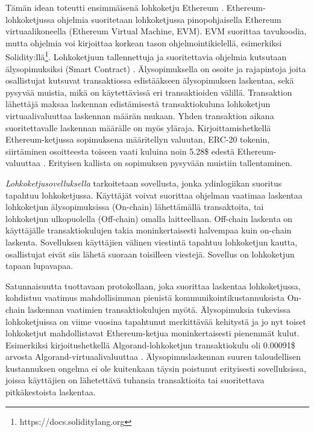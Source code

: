 Tämän idean toteutti ensimmäisenä lohkoketju Ethereum \cite{buterin_ethereum_2014}. Ethereum-lohkoketjussa ohjelmia suoritetaan lohkoketjussa pinopohjaisella Ethereum virtuaalikoneella (Ethereum Virtual Machine, EVM). EVM suorittaa tavukoodia, mutta ohjelmia voi kirjoittaa korkean tason ohjelmointikielellä, esimerkiksi Solidity:llä\footnote{https://docs.soliditylang.org}. Lohkoketjuun tallennettuja ja suoritettavia ohjelmia kutsutaan älysopimuksiksi (Smart Contract) \cite{buterin_ethereum_2014}.  Älysopimuksella on osoite ja rajapintoja joita osallistujat kutsuvat transaktiossa edistääkseen älysopimuksen laskentaa, sekä pysyvää muistia, mikä on käytettävissä eri transaktioiden välillä. Transaktion lähettäjä maksaa laskennan edistämisestä transaktiokuluna lohkoketjun virtuaalivaluuttaa laskennan määrän mukaan. Yhden transaktion aikana suoritettavalle laskennan määrälle on myös yläraja. Kirjoittamishetkellä Ethereum-ketjussa sopimuksena määritellyn valuutan, ERC-20 tokenin, siirtäminen osoitteesta toiseen vaati kuluina noin 5.28\$ edestä Ethereum-valuuttaa \cite{etherscanio_ethereum_nodate}. Erityisen kallista on sopimuksen pysyvään muistiin tallentaminen.

\textit{Lohkoketjusovelluksella} tarkoitetaan sovellusta, jonka ydinlogiikan suoritus tapahtuu lohkoketjussa. Käyttäjät voivat suorittaa ohjelman vaatimaa laskentaa lohkoketjun älysopimuksissa (On-chain) lähettämällä transaktoita, tai lohkoketjun ulkopuolella (Off-chain) omalla laitteellaan. Off-chain laskenta on käyttäjälle transaktiokulujen takia moninkertaisesti halvempaa kuin on-chain laskenta. Sovelluksen käyttäjien välinen viestintä tapahtuu lohkoketjun kautta, osallistujat eivät siis lähetä suoraan toisilleen viestejä. Sovellus on lohkoketjun tapaan lupavapaa.

Satunnaisuutta tuottavaan protokollaan, joka suorittaa laskentaa lohkoketjussa, kohdistuu vaatimus mahdollisimman pienistä kommunikointikustannuksista On-chain laskennan vaatimien transaktiokulujen myötä. Älysopimuksia tukevissa lohkoketjuissa on viime vuosina tapahtunut merkittävää kehitystä ja jo nyt toiset lohkoketjut mahdollistavat Ethereum-ketjua moninkertaisesti pienemmät kulut. Esimerkiksi kirjoitushetkellä Algorand-lohkoketjun transaktiokulu oli 0.00091\$ arvosta Algorand-virtuaalivaluuttaa \cite{noauthor_algorand_nodate}. Älysopimuslaskennan suuren taloudellisen kustannuksen ongelma ei ole kuitenkaan täysin poistunut erityisesti sovelluksissa, joissa käyttäjien on lähetettävä tuhansia transaktioita tai suoritettava pitkäkestoista laskentaa.

